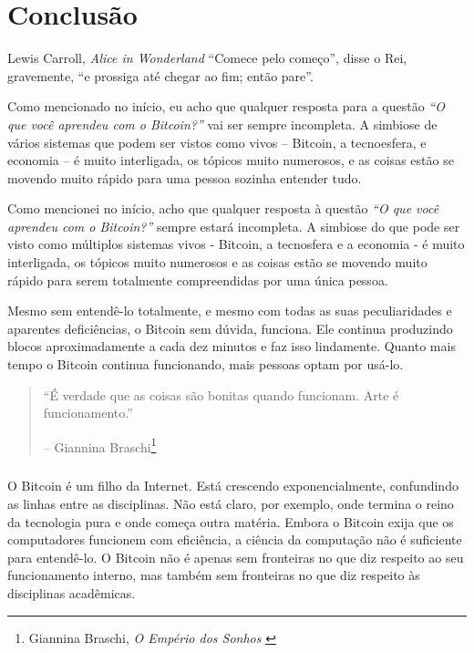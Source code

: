 
\label{ch:conclusion}

\chapter*{Conclusão}

\begin{chapquote}{Lewis Carroll, \textit{Alice in Wonderland}}
\enquote{Comece pelo começo}, disse o Rei, gravemente, \enquote{e prossiga até chegar ao fim; então pare}.

\end{chapquote}
Como mencionado no início, eu acho que qualquer resposta para a questão 
\textit{“O que você aprendeu com o Bitcoin?”} vai ser sempre incompleta. 
A simbiose de vários sistemas que podem ser vistos como vivos -- Bitcoin, 
a tecnoesfera, e economia -- é muito interligada, os tópicos muito numerosos, e 
as coisas estão se movendo muito rápido para uma pessoa sozinha entender tudo.

Como mencionei no início, acho que qualquer resposta à questão \textit{“O que você aprendeu com o Bitcoin?”} sempre estará incompleta. A simbiose do que pode ser visto como múltiplos sistemas vivos - Bitcoin, a tecnosfera e a economia - é muito interligada, os tópicos muito numerosos e as coisas estão se movendo muito rápido para serem totalmente compreendidas por uma única pessoa.

Mesmo sem entendê-lo totalmente, e mesmo com todas as suas peculiaridades e aparentes deficiências, o Bitcoin sem dúvida, funciona. Ele continua produzindo blocos aproximadamente a cada dez minutos e faz isso lindamente. Quanto mais tempo o Bitcoin continua funcionando, mais pessoas optam por usá-lo.

\begin{quotation}\begin{samepage}
\enquote{É verdade que as coisas são bonitas quando funcionam. Arte é funcionamento.}
\begin{flushright} -- Giannina Braschi\footnote{Giannina Braschi, \textit{O Empério dos Sonhos} \cite{braschi2011empire}}
\end{flushright}\end{samepage}\end{quotation}

\paragraph{}
O Bitcoin é um filho da Internet. Está crescendo exponencialmente, confundindo as linhas entre as disciplinas. Não está claro, por exemplo, onde termina o reino da tecnologia pura e onde começa outra matéria. Embora o Bitcoin exija que os computadores funcionem com eficiência, a ciência da computação não é suficiente para entendê-lo. O Bitcoin não é apenas sem fronteiras no que diz respeito ao seu funcionamento interno, mas também sem fronteiras no que diz respeito às disciplinas acadêmicas.

